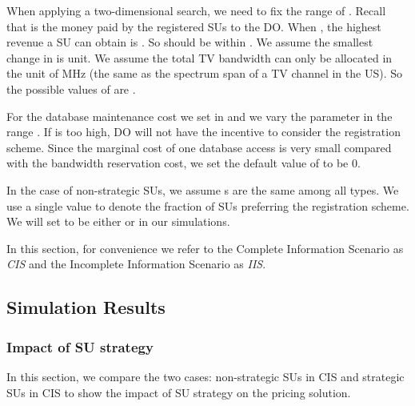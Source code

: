 \documentclass[journal]{IEEEtran}
\begin{document}
When applying a two-dimensional search, we need to fix the range of . Recall that  is the money paid by the registered SUs to the DO. When , the highest revenue a SU can obtain is . So  should be within . We assume the smallest change in  is  unit. We assume the total TV bandwidth can only be allocated in the unit of  MHz (the same as the spectrum span of a TV channel in the US). So the possible values of  are .

For the database maintenance cost we set  in  and we vary the parameter  in the range . If  is too high, DO will not have the incentive to consider the registration scheme. Since the marginal cost of one database access is very small compared with the bandwidth reservation cost, we set the default value of  to be 0.

In the case of non-strategic SUs, we assume s are the same among all types. We use a single value  to denote the fraction of SUs preferring the registration scheme. We will set  to be either  or  in our simulations.

In this section, for convenience we refer to the Complete Information Scenario as \emph{CIS} and the Incomplete Information Scenario as \emph{IIS}.

\subsection{Simulation Results}

\subsubsection{Impact of SU strategy}

In this section, we compare the two cases: non-strategic SUs in CIS and strategic SUs in CIS to show the impact of SU strategy on the pricing solution.
\end{document}
